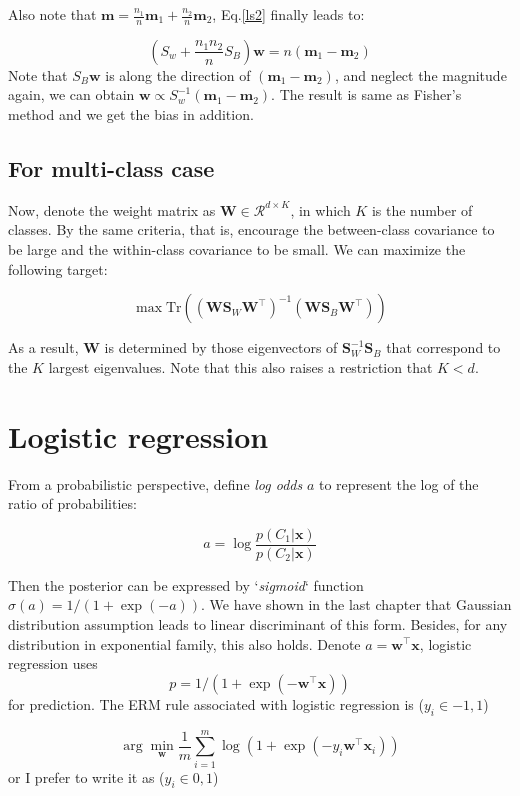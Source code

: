 \documentclass{article}
\begin{document}
Also note that $\mathbf{m}=\frac{n_1}{n}\mathbf{m}_1 + \frac{n_2}{n} \mathbf{m}_2$, Eq.\ref{ls2} finally leads to:

	$$(S_w + \frac{n_1 n_2}{n} S_B) \mathbf{w} = n(\mathbf{m}_1 - \mathbf{m}_2)$$
Note that $S_B \mathbf{w}$ is along the direction of $(\mathbf{m}_1 - \mathbf{m}_2)$, and neglect the magnitude again, we can obtain $\mathbf{w} \propto S_w^{-1} (\mathbf{m}_1 - \mathbf{m}_2)$. The result is same as Fisher's method and we get the bias in addition.

\subsection{For multi-class case}		
		
		Now, denote the weight matrix as $\mathbf{W}\in \mathcal{R}^{d\times K}$, in which $K$ is the number of classes. By the same criteria, that is, encourage the between-class covariance to be large and  the within-class covariance to be small. We can maximize the following target:
		
		$$
		\max \text{Tr}\left((\mathbf{WS}_W \mathbf{W}^\top )^{-1}  (\mathbf{WS}_B \mathbf{W}^\top ) \right)
		$$
	
As a result, $\mathbf{W}$ is determined by those eigenvectors of $\mathbf{S}_W^{-1} \mathbf{S}_B$ that correspond to the $K$ largest eigenvalues. Note that this also raises a restriction that $K<d$.
		 
\section{Logistic regression}
	From a probabilistic perspective, define \textit{log odds} $a$ to represent the log of the ratio of probabilities:
	
	$$a=\log \frac{p(C_1|\mathbf{x})}{p(C_2|\mathbf{x})}$$
	
	Then the posterior can be expressed by `\textit{sigmoid}` function $\sigma(a)=1/(1+\exp(-a))$. We have shown in the last chapter that Gaussian distribution assumption leads to linear discriminant of this form. Besides, for any distribution in exponential family, this also holds. Denote $a=\mathbf{w}^\top \mathbf{x}$, logistic regression uses 
	$$p = 1/(1+\exp(-\mathbf{w}^\top \mathbf{x}))$$
for prediction. The ERM rule associated with logistic regression is ($y_i \in {-1, 1}$)

	$$\arg \min_\mathbf{w} \frac{1}{m} \sum_{i=1}^m \log (1+\exp(-y_i \mathbf{w}^\top \mathbf{x}_i ))$$
or I prefer to write it as ($y_i \in {0, 1}$)
\end{document}
